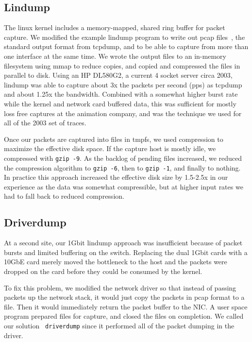 \subsection{Lindump}

The linux kernel includes a memory-mapped, shared ring buffer for
packet capture.  We modified the example lindump program to write out
pcap files~\cite{pcap}, the standard output format from tcpdump, and
to be able to capture from more than one interface at the same time.
We wrote the output files to an in-memory filesystem using mmap to
reduce copies, and copied and compressed the files in parallel to
disk.  Using an HP DL580G2, a current 4 socket server circa 2003,
lindump was able to capture about 3x the packets per second (pps) as
tcpdump and about 1.25x the bandwidth.  Combined with a somewhat
higher burst rate while the kernel and network card buffered data,
this was sufficient for mostly loss free captures at the animation
company, and was the technique we used for all of the 2003 set of
traces.

Once our packets are captured into files in tmpfs, we used compression
to maximize the effective disk space.  If the capture host is mostly
idle, we compressed with {\tt gzip -9}. As the backlog of pending
files increased, we reduced the compression algorithm to {\tt gzip
-6}, then to {\tt gzip -1}, and finally to nothing.  In practice this
approach increased the effective disk size by 1.5-2.5x in our
experience as the data was somewhat compressible, but at higher input
rates we had to fall back to reduced compression.

\subsection{Driverdump}

At a second site, our 1Gbit lindump approach was insufficient because
of packet bursts and limited buffering on the switch.  Replacing the
dual 1Gbit cards with a 10GbE card merely moved the bottleneck to the
host and the packets were dropped on the card before they could be
consumed by the kernel.

To fix this problem, we modified the network driver so that instead of
passing packets up the network stack, it would just copy the packets
in pcap format to a file. Then it would immediately return the packet
buffer to the NIC.  A user space program prepared files for capture,
and closed the files on completion.  We called our solution {\tt
driverdump} since it performed all of the packet dumping in the
driver.

